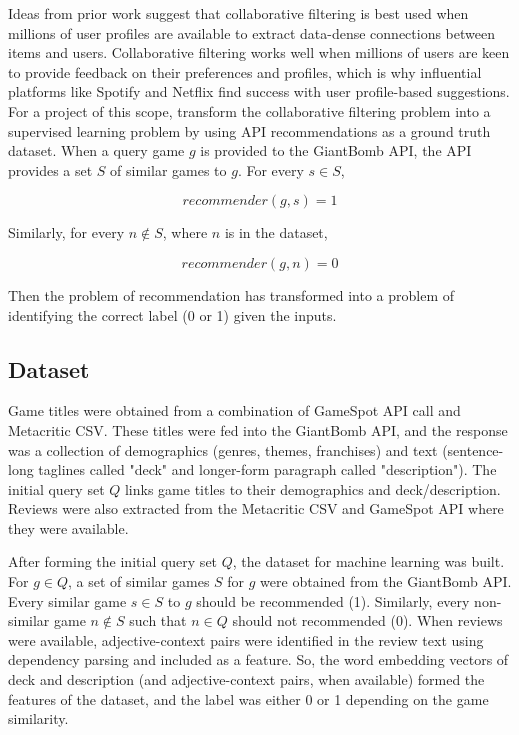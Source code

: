 \documentclass[10pt,twocolumn]{article}
\begin{document}
Ideas from prior work suggest that collaborative filtering is best used when millions of user profiles are available to extract data-dense connections between items and users. Collaborative filtering works well when millions of users are keen to provide feedback on their preferences and profiles, which is why influential platforms like Spotify \cite{JacobsonSpotify}
and Netflix \cite{NetflixRS} find success with user profile-based suggestions. For a project of this scope, transform the collaborative filtering problem into a supervised learning problem by using API recommendations as a ground truth dataset. When a query game $g$ is provided to the GiantBomb API, the API provides a set $S$ of similar games to $g$. For every $s \in S$, 

\begin{equation}
    recommender(g, s) = 1
\end{equation}

Similarly, for every $n \not\in S$, where $n$ is in the dataset,

\begin{equation}
    recommender(g, n) = 0
\end{equation}

Then the problem of recommendation has transformed into a problem of identifying the correct label (0 or 1) given the inputs.

\subsection{Dataset}

Game titles were obtained from a combination of GameSpot API call and Metacritic CSV. These titles were fed into the GiantBomb API, and the response was a collection of demographics (genres, themes, franchises) and text (sentence-long taglines called "deck" and longer-form paragraph called "description"). The initial query set $Q$ links game titles to their demographics and deck/description. Reviews were also extracted from the Metacritic CSV and GameSpot API where they were available.

After forming the initial query set $Q$, the dataset for machine learning was built. For $g \in Q$, a set of similar games $S$ for $g$ were obtained from the GiantBomb API. Every similar game $s \in S$ to $g$ should be recommended (1). Similarly, every non-similar game $n \not\in S$ such that $n \in Q$ should not recommended (0). When reviews were available, adjective-context pairs were identified in the review text using dependency parsing and included as a feature. \cite{Meidl, LDiCaro} So, the word embedding vectors of deck and description (and adjective-context pairs, when available) formed the features of the dataset, and the label was either 0 or 1 depending on the game similarity.
\end{document}

